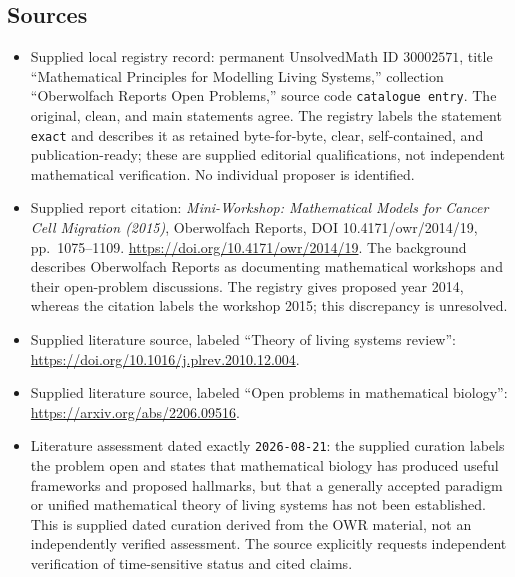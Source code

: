 \documentclass[11pt]{article}
\begin{document}
\subsection{Sources}
\begin{itemize}
\item Supplied local registry record: permanent UnsolvedMath ID \(30002571\), title ``Mathematical Principles for Modelling Living Systems,'' collection ``Oberwolfach Reports Open Problems,'' source code \texttt{catalogue entry}. The original, clean, and main statements agree. The registry labels the statement \texttt{exact} and describes it as retained byte-for-byte, clear, self-contained, and publication-ready; these are supplied editorial qualifications, not independent mathematical verification. No individual proposer is identified.
\item Supplied report citation: \emph{Mini-Workshop: Mathematical Models for Cancer Cell Migration (2015)}, Oberwolfach Reports, DOI 10.4171/owr/2014/19, pp.~1075--1109. \url{https://doi.org/10.4171/owr/2014/19}. The background describes Oberwolfach Reports as documenting mathematical workshops and their open-problem discussions. The registry gives proposed year 2014, whereas the citation labels the workshop 2015; this discrepancy is unresolved.
\item Supplied literature source, labeled ``Theory of living systems review'': \url{https://doi.org/10.1016/j.plrev.2010.12.004}.
\item Supplied literature source, labeled ``Open problems in mathematical biology'': \url{https://arxiv.org/abs/2206.09516}.
\item Literature assessment dated exactly \texttt{2026-08-21}: the supplied curation labels the problem open and states that mathematical biology has produced useful frameworks and proposed hallmarks, but that a generally accepted paradigm or unified mathematical theory of living systems has not been established. This is supplied dated curation derived from the OWR material, not an independently verified assessment. The source explicitly requests independent verification of time-sensitive status and cited claims.
\end{itemize}
\end{document}
